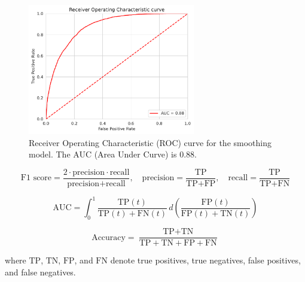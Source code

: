 \begin{figure}[htpb]
    \centering
    \includegraphics[width=0.65\textwidth]{img/smoothing-roc.pdf}
    \caption{Receiver Operating Characteristic (ROC) curve for the smoothing model. The AUC (Area Under Curve) is 0.88.}
    \label{fig:smoothing-roc}
\end{figure}

\begin{equation}
\text{F1 score} = \frac{2 \cdot \text{precision} \cdot \text{recall}}{\text{precision} + \text{recall}}, \quad
\text{precision} = \frac{\text{TP}}{\text{TP} + \text{FP}}, \quad
\text{recall} = \frac{\text{TP}}{\text{TP} + \text{FN}}
\label{eq:f1-score}
\end{equation}

\begin{equation}
\text{AUC} = \int_0^1 \frac{\text{TP}(t)}{\text{TP}(t) + \text{FN}(t)} \, d\left( \frac{\text{FP}(t)}{\text{FP}(t) + \text{TN}(t)} \right)
\label{eq:auc}
\end{equation}

\begin{equation}
\text{Accuracy} = \frac{\text{TP} + \text{TN}}{\text{TP} + \text{TN} + \text{FP} + \text{FN}}
\label{eq:accuracy}
\end{equation}

where $\text{TP}$, $\text{TN}$, $\text{FP}$, and $\text{FN}$ denote true positives, true negatives, false positives, and false negatives.

